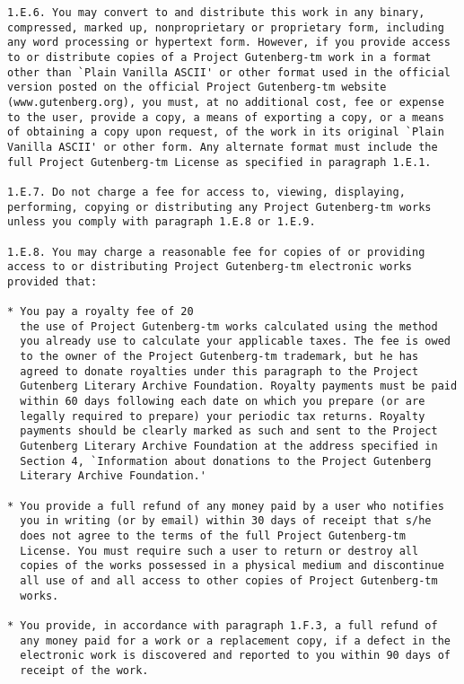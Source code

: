 \documentclass[oneside]{book}
\begin{document}
\begin{verbatim}
1.E.6. You may convert to and distribute this work in any binary,
compressed, marked up, nonproprietary or proprietary form, including
any word processing or hypertext form. However, if you provide access
to or distribute copies of a Project Gutenberg-tm work in a format
other than `Plain Vanilla ASCII' or other format used in the official
version posted on the official Project Gutenberg-tm website
(www.gutenberg.org), you must, at no additional cost, fee or expense
to the user, provide a copy, a means of exporting a copy, or a means
of obtaining a copy upon request, of the work in its original `Plain
Vanilla ASCII' or other form. Any alternate format must include the
full Project Gutenberg-tm License as specified in paragraph 1.E.1.

1.E.7. Do not charge a fee for access to, viewing, displaying,
performing, copying or distributing any Project Gutenberg-tm works
unless you comply with paragraph 1.E.8 or 1.E.9.

1.E.8. You may charge a reasonable fee for copies of or providing
access to or distributing Project Gutenberg-tm electronic works
provided that:

* You pay a royalty fee of 20
  the use of Project Gutenberg-tm works calculated using the method
  you already use to calculate your applicable taxes. The fee is owed
  to the owner of the Project Gutenberg-tm trademark, but he has
  agreed to donate royalties under this paragraph to the Project
  Gutenberg Literary Archive Foundation. Royalty payments must be paid
  within 60 days following each date on which you prepare (or are
  legally required to prepare) your periodic tax returns. Royalty
  payments should be clearly marked as such and sent to the Project
  Gutenberg Literary Archive Foundation at the address specified in
  Section 4, `Information about donations to the Project Gutenberg
  Literary Archive Foundation.'

* You provide a full refund of any money paid by a user who notifies
  you in writing (or by email) within 30 days of receipt that s/he
  does not agree to the terms of the full Project Gutenberg-tm
  License. You must require such a user to return or destroy all
  copies of the works possessed in a physical medium and discontinue
  all use of and all access to other copies of Project Gutenberg-tm
  works.

* You provide, in accordance with paragraph 1.F.3, a full refund of
  any money paid for a work or a replacement copy, if a defect in the
  electronic work is discovered and reported to you within 90 days of
  receipt of the work.


\end{verbatim}
\end{document}

